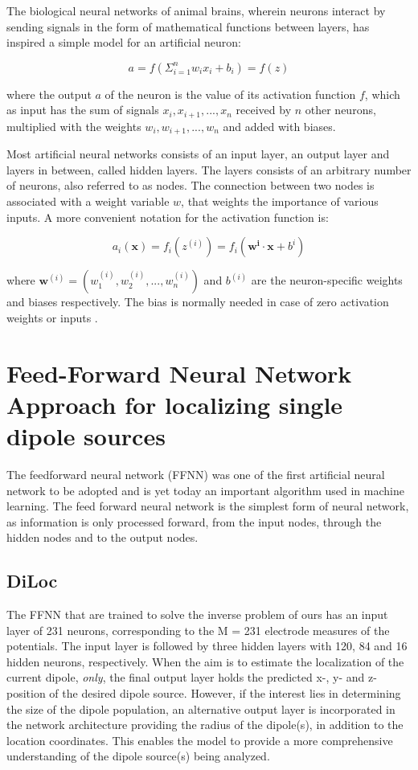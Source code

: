\documentclass[a4paper, UKenglish, 11pt]{uiomaster}
\begin{document}
The biological neural networks of animal brains, wherein neurons interact by sending signals in the form of mathematical functions between layers, has inspired a simple model for an artificial neuron:

\begin{equation}
    a = f \left( \Sigma_{i=1}^n w_ix_i + b_i\right ) = f(z)
    \label{eq:NN}
\end{equation}

where the output $a$ of the neuron is the value of its activation function $f$, which as input has the sum of signals $x_i, x_{i+1}, ..., x_n$ received by $n$ other neurons, multiplied with the weights $w_i, w_{i+1}, ..., w_n$ and added with biases.

Most artificial neural networks consists of an input layer, an output layer and layers in between, called hidden layers. The layers consists of an arbitrary number of neurons, also referred to as nodes. The connection between two nodes is associated with a weight variable $w$, that weights the importance of various inputs. A more convenient notation for the activation function is:

\begin{equation}
    a_i(\boldsymbol{x}) = f_i(z^{(i)}) = f_i(\boldsymbol{w^{i}}\cdot \boldsymbol{x} + b^{i})
\label{eq:NN_vec}
\end{equation}

where $\boldsymbol{w}^{(i)} = (w_1^{(i)}, w_2^{(i)}, ..., w_n^{(i)})$ and $b^{(i)}$ are the neuron-specific weights and biases respectively. The bias is normally needed in case of zero activation weights or inputs \cite{101}.

\section{Feed-Forward Neural Network Approach for localizing single dipole sources}
The feedforward neural network (FFNN) was one of the first artificial neural network to be adopted and is yet today an important algorithm used in machine learning. The feed forward neural network is the simplest form of neural network, as information is only processed forward, from the input nodes, through the hidden nodes and to the output nodes.


\subsection{DiLoc}
The FFNN that are trained to solve the inverse problem of ours has an input layer of 231 neurons, corresponding to the M = 231 electrode measures of the potentials. The input layer is followed by three hidden layers with 120, 84 and 16 hidden neurons, respectively. When the aim is to estimate the localization of the current dipole, \emph{only}, the final output layer holds the predicted x-, y- and z- position of the desired dipole source.  However, if the interest lies in determining the size of the dipole population, an alternative output layer is incorporated in the network architecture providing the radius of the dipole(s), in addition to the location coordinates. This enables the model to provide a more comprehensive understanding of the dipole source(s) being analyzed.
\end{document}
